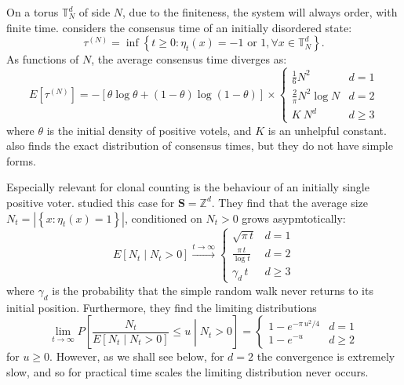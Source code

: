 \documentclass[10pt,english]{report}
\begin{document}
On a torus $\mathbb{T}_N^d$ of side $N$, due to the finiteness, the system will always order, with finite time. \citet{voterconsensus} considers the consensus time of an initially disordered state: $$\tau^{(N)} = \inf \left\{ t \ge 0 : \eta_t(x) = \textrm{$-1$ or $1$}, \forall x \in \mathbb{T}_N^d \right\}.$$ As functions of $N$, the average consensus time diverges as:
\begin{equation*}
E\left[\tau^{(N)}\right] = -\left[\theta \log \theta + (1-\theta) \log (1-\theta) \right]\times\begin{cases}
\frac{1}{6} N^2           & d = 1 \\
\frac{2}{\pi} N^2 \log N  & d = 2 \\
K~N^d                     & d \ge 3
\end{cases}
\end{equation*}
where $\theta$ is the initial density of positive votels, and $K$ is an unhelpful constant. \citet{voterconsensus} also finds the exact distribution of consensus times, but they do not have simple forms.

Especially relevant for clonal counting is the behaviour of an initially single positive voter. \citet{bramson&griffeath} studied this case for $\mathbf{S} = \mathbb{Z}^d$. They find that the average size $N_t = \left| \left\{x: \eta_t(x) = 1\right\} \right|$, conditioned on $N_t > 0$ grows asypmtotically:
\begin{equation*}
E\left[N_t\middle|N_t>0\right] \overset{t \rightarrow \infty}{\longrightarrow} \begin{cases}
\sqrt{\pi\,t}         & d = 1 \\
\frac{\pi\,t}{\log t} & d = 2 \\
\gamma_d\,t           & d \ge 3
\end{cases}
\end{equation*}
where $\gamma_d$ is the probability that the simple random walk never returns to its initial position. Furthermore, they find the limiting distributions
\begin{equation*}
\lim_{t\rightarrow\infty} P\left[\frac{N_t}{E\left[N_t\middle|N_t>0\right]} \le u \middle| N_t > 0\right] = \begin{cases}
1 - e^{-\pi\,u^2/4} & d = 1 \\
1 - e^{-u}     & d \ge 2
\end{cases}
\end{equation*} for $u \ge 0$. However, as we shall see below, for $d=2$ the convergence is extremely slow, and so for practical time scales the limiting distribution never occurs.
\end{document}
